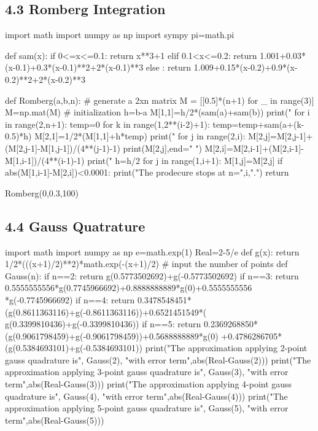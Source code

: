 \documentclass{article}
\begin{document}
    \subsection{4.3 Romberg Integration}
    \begin{python}
    import math
    import numpy as np
    import sympy
    pi=math.pi

    def sam(x):
        if 0<=x<=0.1:
            return x**3+1
        elif 0.1<x<=0.2:
            return 1.001+0.03*(x-0.1)+0.3*(x-0.1)**2+2*(x-0.1)**3
        else :
            return 1.009+0.15*(x-0.2)+0.9*(x-0.2)**2+2*(x-0.2)**3

    def Romberg(a,b,n):
        # generate a 2xn matrix 
        M = [[0.5]*(n+1) for _ in range(3)]
        M=np.mat(M)
        # initialization
        h=b-a
        M[1,1]=h/2*(sam(a)+sam(b))
        print("%
        for i in range(2,n+1):
            temp=0
            for k in range(1,2**(i-2)+1):
                temp=temp+sam(a+(k-0.5)*h)
            M[2,1]=1/2*(M[1,1]+h*temp)
            print("%
            for j in range(2,i):
                M[2,j]=M[2,j-1]+(M[2,j-1]-M[1,j-1])/(4**(j-1)-1)
                print(M[2,j],end="    ")
            M[2,i]=M[2,i-1]+(M[2,i-1]-M[1,i-1])/(4**(i-1)-1)
            print("%
            h=h/2
            for j in range(1,i+1):
                M[1,j]=M[2,j]
            if abs(M[1,i-1]-M[2,i])<0.0001:
                print("The prodecure stops at n=",i,".")
                return

    Romberg(0,0.3,100)
    \end{python}

    \subsection{4.4 Gauss Quatrature}
    \begin{python}
    import math
    import numpy as np
    e=math.exp(1)
    Real=2-5/e
    def g(x):
        return 1/2*(((x+1)/2)**2)*math.exp(-(x+1)/2)
    # input the number of points 
    def Gauss(n):
        if n==2:
            return g(0.5773502692)+g(-0.5773502692)
        if n==3:
            return 0.5555555556*g(0.7745966692)+0.8888888889*g(0)+0.5555555556
            *g(-0.7745966692)
        if n==4:
            return 0.3478548451*(g(0.8611363116)+g(-0.8611363116))+0.6521451549*(
            g(0.3399810436)+g(-0.3399810436))
        if n==5:
            return 0.2369268850*(g(0.9061798459)+g(-0.9061798459))+0.5688888889*g(0)
            +0.4786286705*(g(0.5384693101)+g(-0.5384693101))
    print("The approximation applying 2-point gauss quadrature is", Gauss(2), "with error term",abs(Real-Gauss(2)))
    print("The approximation applying 3-point gauss quadrature is", Gauss(3), "with error term",abs(Real-Gauss(3)))
    print("The approximation applying 4-point gauss quadrature is", Gauss(4), "with error term",abs(Real-Gauss(4)))
    print("The approximation applying 5-point gauss quadrature is", Gauss(5), "with error term",abs(Real-Gauss(5)))
    \end{python}
\end{document}
